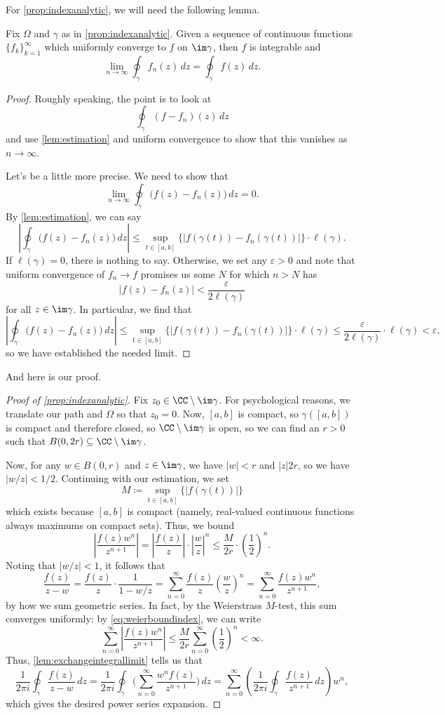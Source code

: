 \documentclass[../notes.tex]{subfiles}
\begin{document}
For \autoref{prop:indexanalytic}, we will need the following lemma.
\begin{lemma} \label{lem:exchangeintegrallimit}
	Fix $\Omega$ and $\gamma$ as in \autoref{prop:indexanalytic}. Given a sequence of continuous functions $\{f_k\}_{k=1}^\infty$ which uniformly converge to $f$ on $\im\gamma$, then $f$ is integrable and
	\[\lim_{n\to\infty}\oint_\gamma f_n(z)\,dz=\oint_\gamma f(z)\,dz.\]
\end{lemma}
\begin{proof}
	Roughly speaking, the point is to look at
	\[\oint_\gamma(f-f_n)(z)\,dz\]
	and use \autoref{lem:estimation} and uniform convergence to show that this vanishes as $n\to\infty$.

	Let's be a little more precise. We need to show that
	\[\lim_{n\to\infty}\oint_\gamma\big(f(z)-f_n(z)\big)\,dz=0.\]
	By \autoref{lem:estimation}, we can say
	\[\left|\oint_\gamma\big(f(z)-f_n(z)\big)\,dz\right|\le\sup_{t\in[a,b]}\{|f(\gamma(t))-f_n(\gamma(t))|\}\cdot\ell(\gamma).\]
	If $\ell(\gamma)=0$, there is nothing to say. Otherwise, we set any $\varepsilon>0$ and note that uniform convergence of $f_n\to f$ promises us some $N$ for which $n>N$ has
	\[|f(z)-f_n(z)|<\frac{\varepsilon}{2\ell(\gamma)}\]
	for all $z\in\im\gamma$. In particular, we find that
	\[\left|\oint_\gamma\big(f(z)-f_n(z)\big)\,dz\right|\le\sup_{t\in[a,b]}\{|f(\gamma(t))-f_n(\gamma(t))|\}\cdot\ell(\gamma)\le\frac\varepsilon{2\ell(\gamma)}\cdot\ell(\gamma)<\varepsilon,\]
	so we have established the needed limit.
\end{proof}
And here is our proof.
\begin{proof}[Proof of \autoref{prop:indexanalytic}]
	Fix $z_0\in\CC\setminus\im\gamma$. For psychological reasons, we translate our path and $\Omega$ so that $z_0=0$. Now, $[a,b]$ is compact, so $\gamma([a,b])$ is compact and therefore closed, so $\CC\setminus\im\gamma$ is open, so we can find an $r>0$ such that $B(0,2r)\subseteq\CC\setminus\im\gamma$.

	Now, for any $w\in B(0,r)$ and $z\in\im\gamma$, we have $|w|<r$ and $|z|2r$, so we have $|w/z|<1/2$. Continuing with our estimation, we set
	\[M\coloneqq \sup_{t\in[a,b]}\{|f(\gamma(t))|\}\]
	which exists because $[a,b]$ is compact (namely, real-valued continuous functions always maximums on compact sets). Thus, we bound
	\[\left|\frac{f(z)w^n}{z^{n+1}}\right|=\left|\frac{f(z)}z\right|\cdot\left|\frac wz\right|^n\le\frac M{2r}\cdot\left(\frac12\right)^n.\tag{$*$}\label{eq:weierboundindex}\]
	Noting that $|w/z|<1$, it follows that
	\[\frac{f(z)}{z-w}=\frac{f(z)}z\cdot\frac1{1-w/z}=\sum_{n=0}^\infty\frac{f(z)}z\left(\frac wz\right)^n=\sum_{n=0}^\infty\frac{f(z)w^n}{z^{n+1}},\]
	by how we sum geometric series. In fact, by the Weierstrass $M$-test, this sum converges uniformly: by \autoref{eq:weierboundindex}, we can write
	\[\sum_{n=0}^\infty\left|\frac{f(z)w^n}{z^{n+1}}\right|\le\frac M{2r}\sum_{n=0}^\infty\left(\frac12\right)^n<\infty.\]
	Thus, \autoref{lem:exchangeintegrallimit} tells us that
	\[\frac1{2\pi i}\oint_\gamma\frac{f(z)}{z-w}\,dz=\frac1{2\pi i}\oint_\gamma\Bigg(\sum_{n=0}^\infty\frac{w^nf(z)}{z^{n+1}}\Bigg)\,dz=\sum_{n=0}^\infty\left(\frac1{2\pi i}\oint_\gamma\frac{f(z)}{z^{n+1}}\,dz\right)w^n,\]
	which gives the desired power series expansion.
\end{proof}
\end{document}
